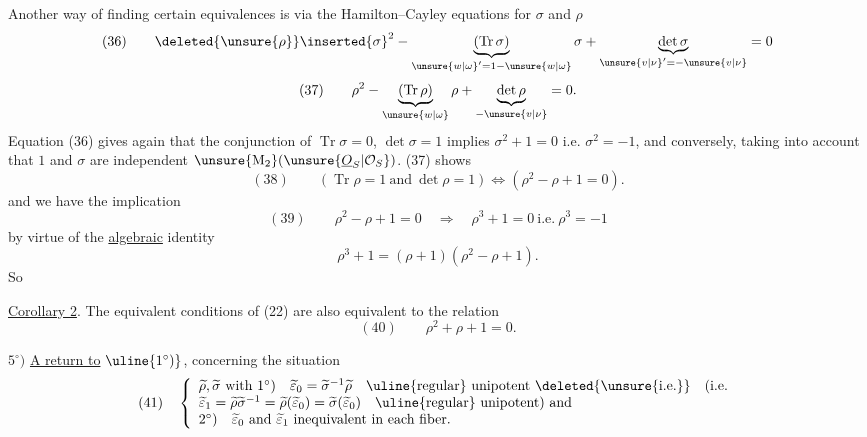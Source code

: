 Another way of finding certain equivalences is via the Hamilton--Cayley equations for $\sigma$ and $\rho$
\[
(36)\qquad
\deleted{\unsure{\rho}}\inserted{\sigma}^2
-\underbrace{(\operatorname{Tr}\sigma)}_{\unsure{w|\omega}'=1-\unsure{w|\omega}}\sigma
+\underbrace{\det\sigma}_{\unsure{v|\nu}'=-\unsure{v|\nu}}=0
\]
\[
(37)\qquad
\rho^2-\underbrace{(\operatorname{Tr}\rho)}_\unsure{w|\omega}\rho
+\underbrace{\det\rho}_{-\unsure{v|\nu}}=0.
\]
Equation (36) gives again that the conjunction of $\operatorname{Tr}\sigma=0$, $\det\sigma=1$ implies $\sigma^2+1=0$ i.e. $\sigma^2=-1$, and conversely, taking into account that $1$ and $\sigma$ are   independent  $\unsure{\mathrm{M}_2}(\unsure{\underline{O}_S|\mathcal O_S})$.
 (37) shows
\[
(38)\qquad
(\operatorname{Tr}\rho=1\ \text{and}\ \det\rho=1)
\Longleftrightarrow(\rho^2-\rho+1=0).
\]
and we  have the implication
\[
(39)\qquad
\rho^2-\rho+1=0\quad\Longrightarrow\quad
\rho^3+1=0\ \text{i.e.}\ \rho^3=-1
\]
by virtue of the \uline{algebraic} identity
\[
\rho^3+1=(\rho+1)(\rho^2-\rho+1).
\]
So

\uline{Corollary 2}. The equivalent conditions of (22) are also equivalent to the relation
\[
(40)\qquad \rho^2+\rho+1=0.
\]




$5^\circ)$ \uline{A return to} $\uline{1^\circ)}$, concerning the situation
\[
(41)\quad
\left\{\begin{array}{l}
\widetilde\rho,\widetilde\sigma\ \text{with }1^\circ)\quad
\widetilde\varepsilon_0=\widetilde\sigma^{-1}\widetilde\rho\quad
\uline{\text{regular}}\text{ unipotent}\ \deleted{\text{\unsure{i.e.}}}\quad(\text{i.e.}\\
\widetilde\varepsilon_1=\widetilde\rho\widetilde\sigma^{-1}
=\widetilde\rho(\widetilde\varepsilon_0)
=\widetilde\sigma(\widetilde\varepsilon_0)\quad
\uline{\text{regular}}\text{ unipotent})\ \text{and}\\
2^\circ)\quad\widetilde\varepsilon_0\ \text{and}\ \widetilde\varepsilon_1\ \text{inequivalent in each fiber.}
\end{array}\right.
\]

